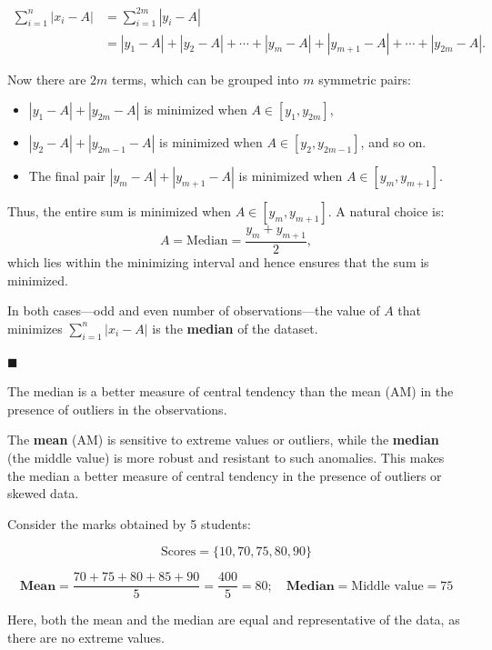 \documentclass[twoside]{book}
\begin{document}
\begin{itemize}
    \begin{align*}
    \sum_{i=1}^{n} |x_i - A| &= \sum_{i=1}^{2m} |y_i - A| \\
    &= |y_1 - A| + |y_2 - A| + \cdots + |y_m - A| + |y_{m+1} - A| + \cdots + |y_{2m} - A|.
    \end{align*}

    Now there are \( 2m \) terms, which can be grouped into \( m \) symmetric pairs:

    \begin{itemize}
        \item \( |y_1 - A| + |y_{2m} - A| \) is minimized when \( A \in [y_1, y_{2m}] \),
        \item \( |y_2 - A| + |y_{2m-1} - A| \) is minimized when \( A \in [y_2, y_{2m-1}] \), and so on.
        \item The final pair \( |y_m - A| + |y_{m+1} - A| \) is minimized when \( A \in [y_m, y_{m+1}] \).
    \end{itemize}

    Thus, the entire sum is minimized when \( A \in [y_m, y_{m+1}] \). A natural choice is:
    \[
    A = \text{Median} = \frac{y_m + y_{m+1}}{2},
    \]
    which lies within the minimizing interval and hence ensures that the sum is minimized.
\end{itemize}

In both cases—odd and even number of observations—the value of \( A \) that minimizes \( \sum_{i=1}^{n} |x_i - A| \) is the \textbf{median} of the dataset.

    \hfill $\blacksquare$

\begin{textbox}
The median is a better measure of central tendency than the mean (AM) in the presence of outliers in the observations.
\end{textbox}

The \textbf{mean} (AM) is sensitive to extreme values or outliers, while the \textbf{median} (the middle value) is more robust and resistant to such anomalies. This makes the median a better measure of central tendency in the presence of outliers or skewed data.

Consider the marks obtained by 5 students:

\[
\text{Scores} = \{10, 70, 75, 80, 90\}
\]

\[\textbf{Mean} = \frac{70 + 75 + 80 + 85 + 90}{5} = \frac{400}{5} = 80; \quad \textbf{Median} = \text{Middle value} = 75
\]

Here, both the mean and the median are equal and representative of the data, as there are no extreme values.
\end{document}
